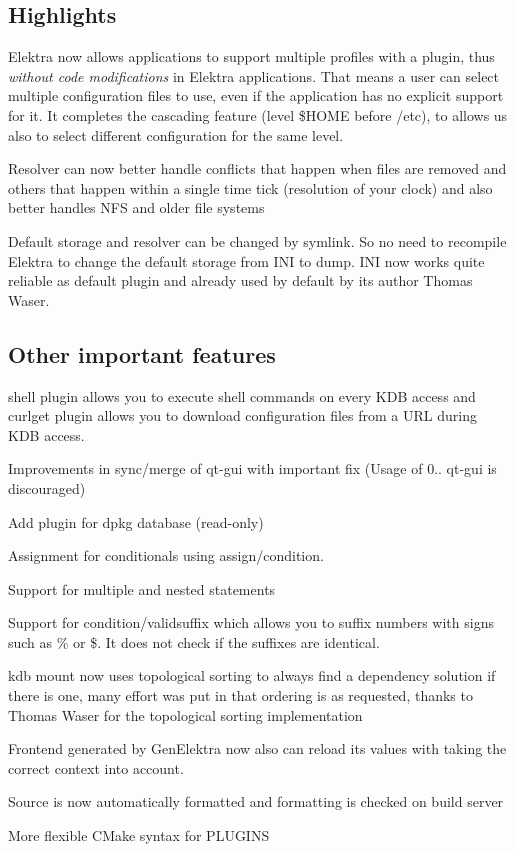 \subsection*{Highlights}


\begin{DoxyItemize}
\item Elektra now allows applications to support multiple profiles with a plugin, thus {\itshape without code modifications} in Elektra applications. That means a user can select multiple configuration files to use, even if the application has no explicit support for it. It completes the cascading feature (level {\ttfamily \$\+H\+O\+ME} before /etc), to allows us also to select different configuration for the same level.
\item Resolver can now better handle conflicts that happen when files are removed and others that happen within a single time tick (resolution of your clock) and also better handles N\+FS and older file systems
\item Default storage and resolver can be changed by symlink. So no need to recompile Elektra to change the default storage from I\+NI to dump. I\+NI now works quite reliable as default plugin and already used by default by its author Thomas Waser.
\end{DoxyItemize}

\subsection*{Other important features}


\begin{DoxyItemize}
\item shell plugin allows you to execute shell commands on every K\+DB access and curlget plugin allows you to download configuration files from a U\+RL during K\+DB access.
\item Improvements in sync/merge of qt-\/gui with important fix (Usage of 0.. qt-\/gui is discouraged)
\item Add plugin for dpkg database (read-\/only)
\item Assignment for conditionals using {\ttfamily assign/condition}.
\item Support for multiple and nested statements
\item Support for {\ttfamily condition/validsuffix} which allows you to suffix numbers with signs such as {\ttfamily \%} or {\ttfamily \$}. It does not check if the suffixes are identical.
\item kdb mount now uses topological sorting to always find a dependency solution if there is one, many effort was put in that ordering is as requested, thanks to Thomas Waser for the topological sorting implementation
\item Frontend generated by Gen\+Elektra now also can reload its values with taking the correct context into account.
\item Source is now automatically formatted and formatting is checked on build server
\item More flexible C\+Make syntax for P\+L\+U\+G\+I\+NS
\end{DoxyItemize}

